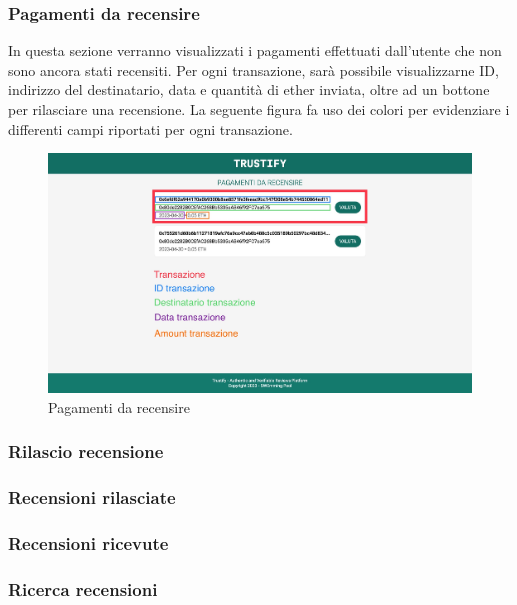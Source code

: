 \subsubsection{Pagamenti da recensire}
In questa sezione verranno visualizzati i pagamenti effettuati dall'utente che non sono ancora stati recensiti. Per ogni transazione, sarà possibile visualizzarne ID, indirizzo del destinatario, data e quantità di ether inviata, oltre ad un bottone per rilasciare una recensione. La seguente figura fa uso dei colori per evidenziare i differenti campi riportati per ogni transazione.
\begin{figure}[H]
    \centering
    \includegraphics[scale=0.18]{src/img/pagamenti.jpg}
    \caption[Pagamenti da recensire]{Pagamenti da recensire\protect\footnotemark}\label{fig:pagamenti}
\end{figure}


\subsubsection{Rilascio recensione}
\subsubsection{Recensioni rilasciate}

\subsubsection{Recensioni ricevute}

\subsubsection{Ricerca recensioni}